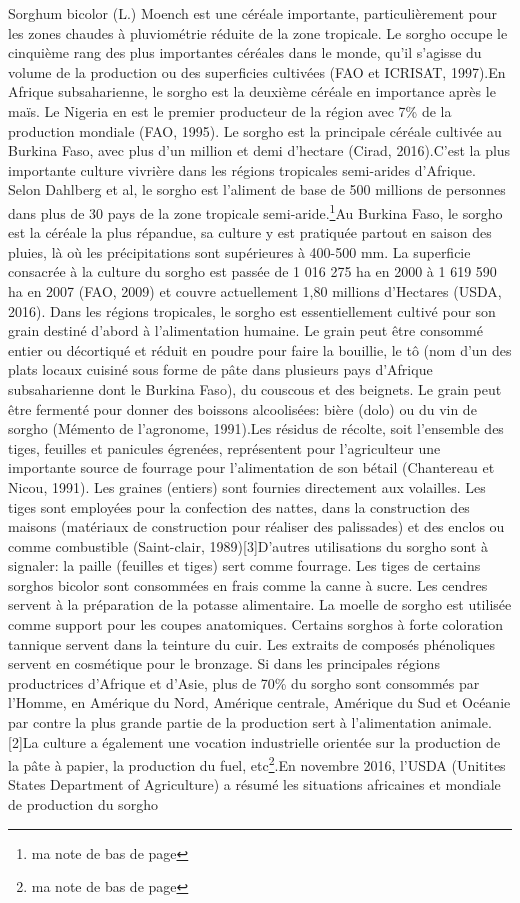 \documentclass[a4paper,11pt]{article}
\begin{document}
Sorghum bicolor (L.) Moench est une céréale importante,
particulièrement pour les zones chaudes à pluviométrie réduite de la
zone tropicale. Le sorgho occupe le cinquième rang des plus
importantes céréales dans le monde, qu’il s’agisse du volume de la
production ou des superficies cultivées (FAO et ICRISAT, 1997).En
Afrique subsaharienne, le sorgho est la deuxième céréale en importance
après le maïs. Le Nigeria en est le premier producteur de la région
avec 7\% de la production mondiale (FAO, 1995). Le sorgho est la
principale céréale cultivée au Burkina Faso, avec plus d’un million et
demi d’hectare (Cirad, 2016).C’est la plus importante culture vivrière
dans les régions tropicales semi-arides d’Afrique. Selon Dahlberg et
al, le sorgho est l’aliment de base de 500 millions de personnes dans
plus de 30 pays de la zone tropicale semi-aride.\footnote{ma note de
bas de page}Au Burkina Faso, le sorgho est la céréale la plus
répandue, sa culture y est pratiquée partout en saison des pluies, là
où les précipitations sont supérieures à 400-500 mm. La superficie
consacrée à la culture du sorgho est passée de 1 016 275 ha en 2000 à
1 619 590 ha en 2007 (FAO, 2009) et couvre actuellement 1,80 millions
d’Hectares (USDA, 2016). Dans les régions tropicales, le sorgho est
essentiellement cultivé pour son grain destiné d’abord à
l’alimentation humaine. Le grain peut être consommé entier ou
décortiqué et réduit en poudre pour faire la bouillie, le tô (nom d’un
des plats locaux cuisiné sous forme de pâte dans plusieurs pays
d’Afrique subsaharienne dont le Burkina Faso), du couscous et des
beignets. Le grain peut être fermenté pour donner des boissons
alcoolisées: bière (dolo) ou du vin de sorgho (Mémento de l’agronome,
1991).Les résidus de récolte, soit l’ensemble des tiges, feuilles et
panicules égrenées, représentent pour l’agriculteur une importante
source de fourrage pour l’alimentation de son bétail (Chantereau et
Nicou, 1991). Les graines (entiers) sont fournies directement aux
volailles. Les tiges sont employées pour la confection des nattes,
dans la construction des maisons (matériaux de construction pour
réaliser des palissades) et des enclos ou comme combustible
(Saint-clair, 1989)[3]D’autres utilisations du sorgho sont à
signaler: la paille (feuilles et tiges) sert comme fourrage. Les
tiges de certains sorghos bicolor sont consommées en frais comme la
canne à sucre. Les cendres servent à la préparation de la potasse
alimentaire. La moelle de sorgho est utilisée comme support pour les
coupes anatomiques. Certains sorghos à forte coloration tannique
servent dans la teinture du cuir. Les extraits de composés phénoliques
servent en cosmétique pour le bronzage. Si dans les principales
régions productrices d’Afrique et d’Asie, plus de 70\% du sorgho sont
consommés par l’Homme, en Amérique du Nord, Amérique centrale,
Amérique du Sud et Océanie par contre la plus grande partie de la
production sert à l’alimentation animale.[2]La culture a également une
vocation industrielle orientée sur la production de la pâte à papier,
la production du fuel, etc\footnote{ma note de bas de page}.En
novembre 2016, l’USDA (Unitites States Department of Agriculture) a
résumé les situations africaines et mondiale de production du sorgho
\end{document}
